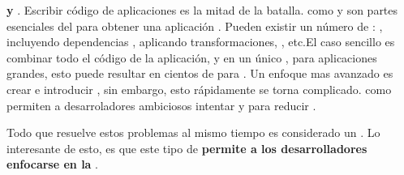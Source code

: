 \begin{itemize}
		\textbf{\buildingPL y \packagingCPT}. Escribir código de aplicaciones \isomorphicAS es la mitad de la batalla. \toolsCPT como \grunttoolNAME y \browserifyNAME son partes esenciales del \workflowCPT para obtener una aplicación \runningCPT. Pueden existir un número de \buildStepsPL: \compilingPL \templatesAS, incluyendo dependencias \clientSideAS, aplicando transformaciones, \minificationPL, etc.El caso sencillo es combinar todo el código de la aplicación, \viewsAS y \templatesAS en un único \bundleCPT, para aplicaciones grandes, esto puede resultar en cientos de \kilobytesPC para \downloadCPT. Un enfoque mas avanzado es crear \dynamicBundlesCPT e introducir \lazyLoadingCPT \assetsAS, sin embargo, esto rápidamente se torna complicado. \toolsCPT \statAnalyCPT como \esprimaNAME permiten a desarroladores ambiciosos intentar \optimizationQA y \metaprogrammingPC para reducir \boilerplateCodeAS.
\end{itemize}

Todo \frameworkPC que resuelve estos problemas al mismo tiempo es considerado un \isomorphicJSFwASref. Lo interesante de esto, es que este tipo de \frameworksPC \textbf{permite a los desarrolladores enfocarse en la \businessLogicAS}.



